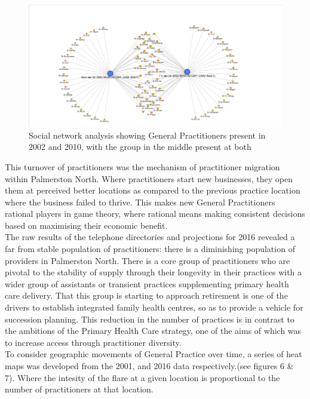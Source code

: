 \documentclass[11pt,a4paper]{article}
\begin{document}
\begin{figure}[htp]
\centering
\includegraphics[scale=0.4]{fig3.png}
\caption{Social network analysis showing General Practitioners present in 2002 and 2010, with the group in the middle present at both}
\label{General Practitioners present in 2002 and 2010}
\end{figure}

This turnover of practitioners was the mechanism of practitioner migration within Palmerston North. Where practitioners start new businesses, they open them at perceived better locations as compared to the previous practice location where the business failed to thrive. This makes new General Practitioners rational players in game theory, where rational means making consistent decisions based on maximising their economic benefit. \\

The raw results of the telephone directories and projections for 2016 revealed a far from stable population of practitioners: there is a diminishing population of providers in Palmerston North. There is a core group of practitioners who are pivotal to the stability of supply through their longevity in their practices with a wider group of assistants or transient practices supplementing primary health care delivery. That this group is starting to approach retirement is one of the drivers to establish integrated family health centres, so as to provide a vehicle for succession planning. This reduction in the number of practices is in contrast to the ambitions of the Primary Health Care strategy, one of the aims of which was to increase access through practitioner diversity.  \\

To consider geographic movements of General Practice over time, a series of heat maps was developed from the 2001, and 2016 data respectively.(see figures 6 \& 7). Where the intesity of the flare at a given location is proportional to the number of practitioners at that location.\\ 
\end{document}
